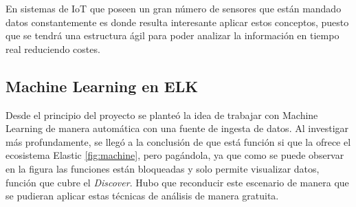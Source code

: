 En sistemas de IoT que poseen un gran número de sensores que están mandado datos constantemente es donde resulta interesante aplicar estos conceptos, puesto que se tendrá una estructura ágil para poder analizar la información en tiempo real reduciendo costes.

\paragraph{}
\paragraph{}
\paragraph{}
\paragraph{}
\paragraph{}
\paragraph{}
\paragraph{  }
\paragraph{  }


\subsection{Machine Learning en ELK}

Desde el principio del proyecto se planteó la idea de trabajar con Machine Learning de manera automática con una fuente de ingesta de datos. Al investigar más profundamente, se llegó a la conclusión de que está función si que la ofrece el ecosistema Elastic \ref{fig:machine}, pero pagándola, ya que como se puede observar en la figura las funciones están bloqueadas y solo permite visualizar datos, función que cubre el \textit{Discover}. Hubo que reconducir este escenario de manera que se pudieran aplicar estas técnicas de análisis de manera gratuita.

